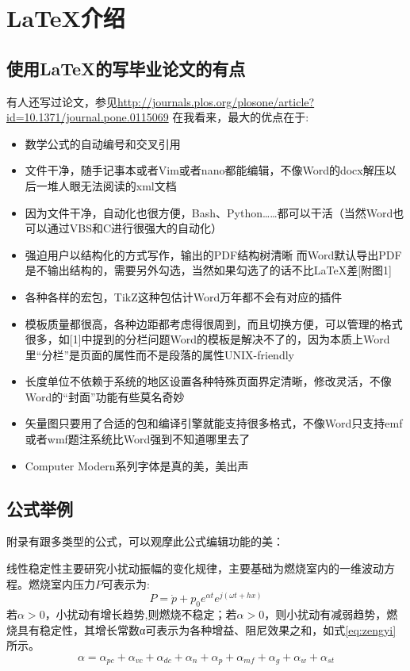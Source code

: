 \chapter{\LaTeX{}介绍}
\section{使用\LaTeX{}的写毕业论文的有点}
有人还写过论文，参见\url{http://journals.plos.org/plosone/article?id=10.1371/journal.pone.0115069}
在我看来，最大的优点在于:
\begin{itemize}
	\item 数学公式的自动编号和交叉引用
	\item 文件干净，随手记事本或者Vim或者nano都能编辑，不像Word的docx解压以后一堆人眼无法阅读的xml文档
	\item 因为文件干净，自动化也很方便，Bash、Python……都可以干活（当然Word也可以通过VBS和C进行很强大的自动化）
	\item 强迫用户以结构化的方式写作，输出的PDF结构树清晰
	而Word默认导出PDF是不输出结构的，需要另外勾选，当然如果勾选了的话不比LaTeX差[附图1]
	\item 各种各样的宏包，TikZ这种包估计Word万年都不会有对应的插件
	\item 模板质量都很高，各种边距都考虑得很周到，而且切换方便，可以管理的格式很多，如[1]中提到的分栏问题Word的模板是解决不了的，因为本质上Word里“分栏”是页面的属性而不是段落的属性UNIX-friendly
	\item 长度单位不依赖于系统的地区设置各种特殊页面界定清晰，修改灵活，不像Word的“封面”功能有些莫名奇妙
	\item 矢量图只要用了合适的包和编译引擎就能支持很多格式，不像Word只支持emf或者wmf题注系统比Word强到不知道哪里去了
\item 	Computer Modern系列字体是真的美，美出声
\end{itemize}


\section{公式举例}
附录有跟多类型的公式，可以观摩此公式编辑功能的美：

线性稳定性主要研究小扰动振幅的变化规律，主要基础为燃烧室内的一维波动方程。燃烧室内压力$P$可表示为:
\begin{equation}
P=\dot{p}+p_0 e^{\alpha t} e^{j(\omega t+hx)}\label{eq:pressue p}
\end{equation}
若$\alpha>0$，小扰动有增长趋势,则燃烧不稳定；若$\alpha>0$，则小扰动有减弱趋势，燃烧具有稳定性，其增长常数α可表示为各种增益、阻尼效果之和，如式\ref{eq:zengyi}所示。
\begin{equation}
\alpha=\alpha_{pc}+\alpha_{vc}+\alpha_{dc}+\alpha_n+\alpha_p+\alpha_{mf}+\alpha_{g}+\alpha_{w}+\alpha_{st}\label{eq:zengyi}
\end{equation}

